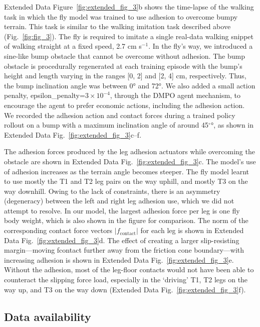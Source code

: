\documentclass[sn-mathphys-num]{sn-jnl}%
\theoremstyle{thmstyleone}	%
\theoremstyle{thmstyletwo}	%
\theoremstyle{thmstylethree}	%
\begin{document}
Extended Data Figure~\ref{fig:extended_fig_3}b shows the time-lapse of the walking task in which the fly model was trained to use adhesion to overcome bumpy terrain. 
This task is similar to the walking imitation task described above (Fig.~\ref{fig:fig_3}). 
The fly is required to imitate a single real-data walking snippet of walking straight at a fixed speed, 2.7 cm s$ ^{-1} $.
In the fly’s way, we introduced a sine-like bump obstacle that cannot be overcome without adhesion. 
The bump obstacle is procedurally regenerated at each training episode with the bump’s height and length varying in the ranges [0, 2] and [2, 4] cm, respectively.
Thus, the bump inclination angle was between 0° and 72°. 
We also added a small action penalty, epsilon\_penalty=$ 3\times 10^{-4} $, through the DMPO agent mechanism, to encourage the agent to prefer economic actions, including the adhesion action. 
We recorded the adhesion action and contact forces during a trained policy rollout on a bump with a maximum inclination angle of around 45$ ^\circ $°, as shown in Extended Data Fig.~\ref{fig:extended_fig_3}c–f.


The adhesion forces produced by the leg adhesion actuators while overcoming the obstacle are shown in Extended Data Fig.~\ref{fig:extended_fig_3}c. 
The model’s use of adhesion increases as the terrain angle becomes steeper. 
The fly model learnt to use mostly the T1 and T2 leg pairs on the way uphill, and mostly T3 on the way downhill. 
Owing to the lack of constraints, there is an asymmetry (degeneracy) between the left and right leg adhesion use, which we did not attempt to resolve. 
In our model, the largest adhesion force per leg is one fly body weight, which is also shown in the figure for comparison. The norm of the corresponding contact force vectors $ | f_\text{contact} | $ for each leg is shown in Extended Data Fig.~\ref{fig:extended_fig_3}d. 
The effect of creating a larger slip-resisting margin—moving fcontact further away from the friction cone boundary—with increasing adhesion is shown in Extended Data Fig.~\ref{fig:extended_fig_3}e. 
Without the adhesion, most of the leg-floor contacts would not have been able to counteract the slipping force load, especially in the ‘driving’ T1, T2 legs on the way up, and T3 on the way down (Extended Data Fig.~\ref{fig:extended_fig_3}f).



\subsection{Data availability} \label{sec:data_availability}
\end{document}
